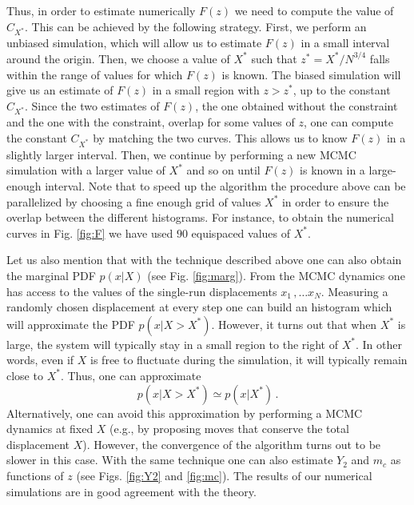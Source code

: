 \documentclass[aps,pre,twocolumn,superscriptaddress,showpacs]{revtex4-1}
\begin{document}
Thus, in order to estimate numerically $F(z)$ we need to compute the value of $C_{X^*}$. This can be achieved by the following strategy. First, we perform an unbiased simulation, which will allow us to estimate $F(z)$ in a small interval around the origin. Then, we choose a value of $X^*$ such that $z^*=X^*/N^{3/4}$ falls within the range of values for which $F(z)$ is known. The biased simulation will give us an estimate of $F(z)$ in a small region with $z>z^*$, up to the constant $C_{X^*}$. Since the two estimates of $F(z)$, the one obtained without the constraint and the one with the constraint, overlap for some values of $z$, one can compute the constant $C_{X^*}$ by matching the two curves. This allows us to know $F(z)$ in a slightly larger interval. Then, we continue by performing a new MCMC simulation with a larger value of $X^*$ and so on until $F(z)$ is known in a large-enough interval. Note that to speed up the algorithm the procedure above can be parallelized by choosing a fine enough grid of values $X^*$ in order to ensure the overlap between the different histograms. For instance, to obtain the numerical curves in Fig. \ref{fig:F} we have used $90$ equispaced values of $X^*$. 

Let us also mention that with the technique described above one can also obtain the marginal PDF $p(x|X)$ (see Fig. \ref{fig:marg}). From the MCMC dynamics one has access to the values of the single-run displacements $x_1\,,\ldots x_N$. Measuring a randomly chosen displacement at every step one can build an histogram which will approximate the PDF $p(x|X>X^*)$. However, it turns out that when $X^*$ is large, the system will typically stay in a small region to the right of $X^*$. In other words, even if $X$ is free to fluctuate during the simulation, it will typically remain close to $X^*$. Thus, one can approximate
\begin{equation}
p(x|X>X^*)\simeq p(x|X^*)\,.
\end{equation}
Alternatively, one can avoid this approximation by performing a MCMC dynamics at fixed $X$ (e.g., by proposing moves that conserve the total displacement $X$). However, the convergence of the algorithm turns out to be slower in this case. With the same technique one can also estimate $Y_2$ and $m_c$ as functions of $z$ (see Figs. \ref{fig:Y2} and \ref{fig:mc}). The results of our numerical simulations are in good agreement with the theory.
 
\end{document}

